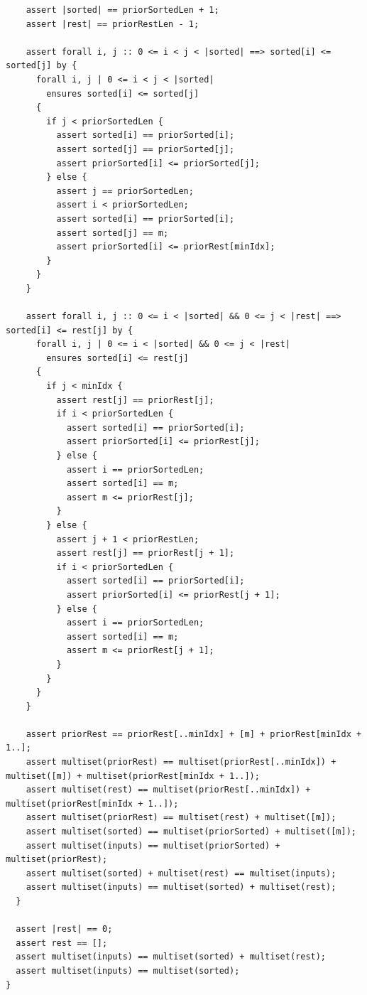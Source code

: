 \documentclass{article}
\begin{document}
\begin{lstlisting}
    assert |sorted| == priorSortedLen + 1;
    assert |rest| == priorRestLen - 1;

    assert forall i, j :: 0 <= i < j < |sorted| ==> sorted[i] <= sorted[j] by {
      forall i, j | 0 <= i < j < |sorted|
        ensures sorted[i] <= sorted[j]
      {
        if j < priorSortedLen {
          assert sorted[i] == priorSorted[i];
          assert sorted[j] == priorSorted[j];
          assert priorSorted[i] <= priorSorted[j];
        } else {
          assert j == priorSortedLen;
          assert i < priorSortedLen;
          assert sorted[i] == priorSorted[i];
          assert sorted[j] == m;
          assert priorSorted[i] <= priorRest[minIdx];
        }
      }
    }

    assert forall i, j :: 0 <= i < |sorted| && 0 <= j < |rest| ==> sorted[i] <= rest[j] by {
      forall i, j | 0 <= i < |sorted| && 0 <= j < |rest|
        ensures sorted[i] <= rest[j]
      {
        if j < minIdx {
          assert rest[j] == priorRest[j];
          if i < priorSortedLen {
            assert sorted[i] == priorSorted[i];
            assert priorSorted[i] <= priorRest[j];
          } else {
            assert i == priorSortedLen;
            assert sorted[i] == m;
            assert m <= priorRest[j];
          }
        } else {
          assert j + 1 < priorRestLen;
          assert rest[j] == priorRest[j + 1];
          if i < priorSortedLen {
            assert sorted[i] == priorSorted[i];
            assert priorSorted[i] <= priorRest[j + 1];
          } else {
            assert i == priorSortedLen;
            assert sorted[i] == m;
            assert m <= priorRest[j + 1];
          }
        }
      }
    }

    assert priorRest == priorRest[..minIdx] + [m] + priorRest[minIdx + 1..];
    assert multiset(priorRest) == multiset(priorRest[..minIdx]) + multiset([m]) + multiset(priorRest[minIdx + 1..]);
    assert multiset(rest) == multiset(priorRest[..minIdx]) + multiset(priorRest[minIdx + 1..]);
    assert multiset(priorRest) == multiset(rest) + multiset([m]);
    assert multiset(sorted) == multiset(priorSorted) + multiset([m]);
    assert multiset(inputs) == multiset(priorSorted) + multiset(priorRest);
    assert multiset(sorted) + multiset(rest) == multiset(inputs);
    assert multiset(inputs) == multiset(sorted) + multiset(rest);
  }

  assert |rest| == 0;
  assert rest == [];
  assert multiset(inputs) == multiset(sorted) + multiset(rest);
  assert multiset(inputs) == multiset(sorted);
}
\end{lstlisting}
\end{document}
